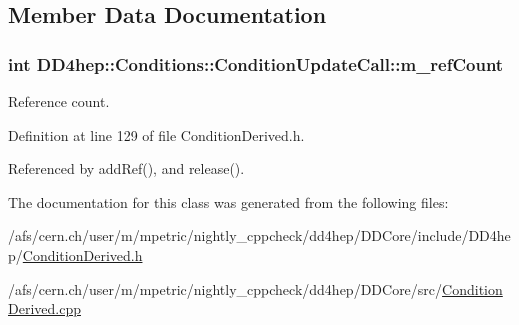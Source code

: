 \subsection{Member Data Documentation}
\hypertarget{class_d_d4hep_1_1_conditions_1_1_condition_update_call_a7456626d494306f498809d5d57150b28}{
\subsubsection[{m\_\-refCount}]{\setlength{\rightskip}{0pt plus 5cm}int {\bf DD4hep::Conditions::ConditionUpdateCall::m\_\-refCount}}}
\label{class_d_d4hep_1_1_conditions_1_1_condition_update_call_a7456626d494306f498809d5d57150b28}


Reference count. 

Definition at line 129 of file ConditionDerived.h.

Referenced by addRef(), and release().

The documentation for this class was generated from the following files:\begin{DoxyCompactItemize}
\item 
/afs/cern.ch/user/m/mpetric/nightly\_\-cppcheck/dd4hep/DDCore/include/DD4hep/\hyperlink{_condition_derived_8h}{ConditionDerived.h}\item 
/afs/cern.ch/user/m/mpetric/nightly\_\-cppcheck/dd4hep/DDCore/src/\hyperlink{_condition_derived_8cpp}{ConditionDerived.cpp}\end{DoxyCompactItemize}
